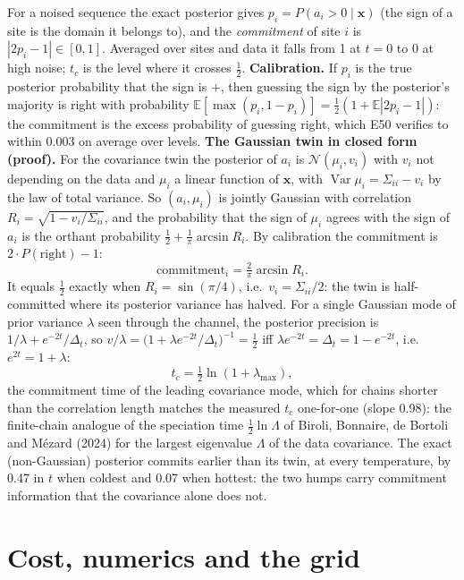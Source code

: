 For a noised sequence the exact posterior gives $p_i=P(a_i>0\mid\mathbf x)$ (the sign of a site is the domain it belongs to), and the \emph{commitment} of site $i$ is $|2p_i-1|\in[0,1]$. Averaged over sites and data it falls from 1 at $t=0$ to 0 at high noise; $t_c$ is the level where it crosses $\tfrac12$.
\textbf{Calibration.} If $p_i$ is the true posterior probability that the sign is $+$, then guessing the sign by the posterior's majority is right with probability $\mathbb E[\max(p_i,1-p_i)]=\tfrac12(1+\mathbb E|2p_i-1|)$: the commitment is the excess probability of guessing right, which E50 verifies to within 0.003 on average over levels.
\textbf{The Gaussian twin in closed form (proof).} For the covariance twin the posterior of $a_i$ is $\mathcal N(\mu_i,v_i)$ with $v_i$ not depending on the data and $\mu_i$ a linear function of $\mathbf x$, with $\operatorname{Var}\mu_i=\Sigma_{ii}-v_i$ by the law of total variance. So $(a_i,\mu_i)$ is jointly Gaussian with correlation
$R_i=\sqrt{1-v_i/\Sigma_{ii}}$, and the probability that the sign of $\mu_i$ agrees with the sign of $a_i$ is the orthant probability $\tfrac12+\tfrac1\pi\arcsin R_i$. By calibration the commitment is $2\cdot P(\text{right})-1$:
\begin{equation}
\text{commitment}_i=\tfrac2\pi\arcsin R_i.
\end{equation}
It equals $\tfrac12$ exactly when $R_i=\sin(\pi/4)$, i.e.\ $v_i=\Sigma_{ii}/2$: the twin is half-committed where its posterior variance has halved. For a single Gaussian mode of prior variance $\lambda$ seen through the channel, the posterior precision is $1/\lambda+e^{-2t}/\Delta_t$, so $v/\lambda=\big(1+\lambda e^{-2t}/\Delta_t\big)^{-1}=\tfrac12$ iff $\lambda e^{-2t}=\Delta_t=1-e^{-2t}$,
i.e.\ $e^{2t}=1+\lambda$:
\begin{equation}
t_c=\tfrac12\ln(1+\lambda_{\max}),
\end{equation}
the commitment time of the leading covariance mode, which for chains shorter than the correlation length matches the measured $t_c$ one-for-one (slope 0.98): the finite-chain analogue of the speciation time $\tfrac12\ln\Lambda$ of Biroli, Bonnaire, de Bortoli and Mézard (2024) for the largest eigenvalue $\Lambda$ of the data covariance.
The exact (non-Gaussian) posterior commits earlier than its twin, at every temperature, by 0.47 in $t$ when coldest and 0.07 when hottest: the two humps carry commitment information that the covariance alone does not.

\section{Cost, numerics and the grid}

